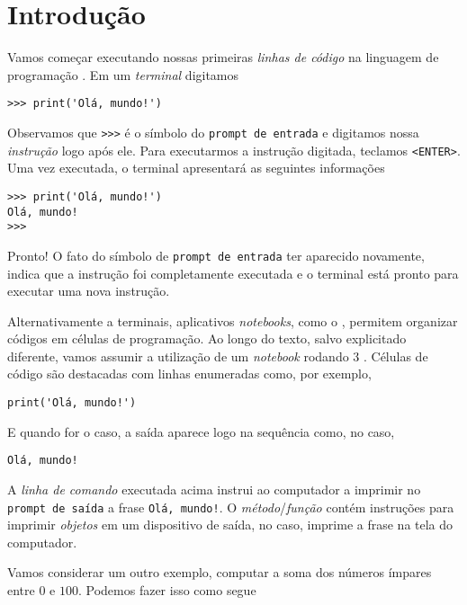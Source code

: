 \chapter{Introdução}\label{cap_intro}

Vamos começar executando nossas primeiras \emph{linhas de código} na linguagem de programação {\python}. Em um \emph{terminal} {\python} digitamos

\begin{lstlisting}
>>> print('Olá, mundo!')
\end{lstlisting}

Observamos que \lstinline+>>>+ é o símbolo do \texttt{prompt de entrada} e digitamos nossa \emph{instrução} logo após ele. Para executarmos a instrução digitada, teclamos \texttt{<ENTER>}. Uma vez executada, o terminal apresentará as seguintes informações

\begin{lstlisting}
>>> print('Olá, mundo!')
Olá, mundo!
>>> 
\end{lstlisting}

Pronto! O fato do símbolo de \texttt{prompt de entrada} ter aparecido novamente, indica que a instrução foi completamente executada e o terminal está pronto para executar uma nova instrução.

Alternativamente a terminais, aplicativos \textit{notebooks}, como o {\jupyter}, permitem organizar códigos {\python} em células de programação. Ao longo do texto, salvo explicitado diferente, vamos assumir a utilização de um \textit{notebook} {\jupyter} rodando {\python} 3 \cite{Python2024a}. Células de código são destacadas com linhas enumeradas como, por exemplo,

\begin{lstlisting}
print('Olá, mundo!')
\end{lstlisting}

E quando for o caso, a saída aparece logo na sequência como, no caso,

\begin{verbatim}
Olá, mundo!
\end{verbatim}

A \emph{linha de comando} executada acima instrui ao computador a imprimir no \texttt{prompt de saída} a frase \texttt{Olá, mundo!}. O \emph{método}/\emph{função} {\PYTHONprint} contém instruções para imprimir \emph{objetos} em um dispositivo de saída, no caso, imprime a frase na tela do computador.

Vamos considerar um outro exemplo, computar a soma dos números ímpares entre $0$ e $100$. Podemos fazer isso como segue

